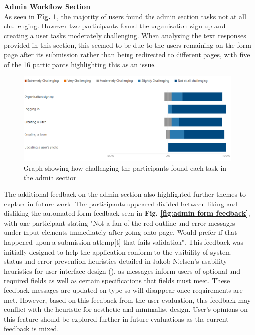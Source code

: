 \documentclass[l4proj.tex]{subfiles}
\begin{document}
\textbf{Admin Workflow Section}\\
As seen in \textbf{Fig. \ref{fig:admin task graph}}, the majority of users found the admin section tasks not at all challenging. However two participants found the organisation sign up and creating a user tasks moderately challenging. When analysing the text responses provided in this section, this seemed to be due to the users remaining on the form page after its submission rather than being redirected to different pages, with five of the 16 participants highlighting this as an issue.

\begin{figure}[h!]
\begin{center}
\includegraphics[scale=0.5]{dissertation/images/EvaluationAdminChallengingGraph.png}
\caption{Graph showing how challenging the participants found each task in the admin section}
\label{fig:admin task graph} 
\end{center}
\end{figure}

The additional feedback on the admin section also highlighted further themes to explore in future work. The participants appeared divided between liking and disliking the automated form feedback seen in \textbf{Fig. \ref{fig:admin form feedback}}, with one participant stating "Not a fan of the red outline and error messages under input elements immediately after going onto page. Would prefer if that happened upon a submission attemp[t] that fails validation". This feedback was initially designed to help the application conform to the visibility of system status and error prevention heuristics detailed in Jakob Nielsen's usability heuristics for user interface design (\cite{NeilsenHeuristics}), as messages inform users of optional and required fields as well as certain specifications that fields must meet. These feedback messages are updated on type so will disappear once requirements are met. However, based on this feedback from the user evaluation, this feedback may conflict with the heuristic for aesthetic and minimalist design. User's opinions on this feature should be explored further in future evaluations as the current feedback is mixed.
\end{document}
